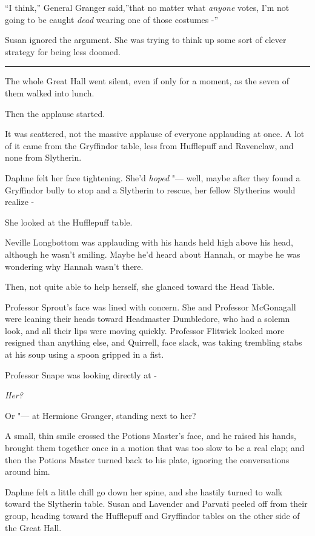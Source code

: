 ``I think,'' General Granger said,''that no matter what \emph{anyone}
votes, I'm not going to be caught \emph{dead} wearing one of those
costumes -''

Susan ignored the argument. She was trying to think up some sort of
clever strategy for being less doomed.

\begin{center}\rule{3in}{0.4pt}\end{center}

The whole Great Hall went silent, even if only for a moment, as the
seven of them walked into lunch.

Then the applause started.

It was scattered, not the massive applause of everyone applauding at
once. A lot of it came from the Gryffindor table, less from Hufflepuff
and Ravenclaw, and none from Slytherin.

Daphne felt her face tightening. She'd \emph{hoped} "--- well, maybe after
they found a Gryffindor bully to stop and a Slytherin to rescue, her
fellow Slytherins would realize -

She looked at the Hufflepuff table.

Neville Longbottom was applauding with his hands held high above his
head, although he wasn't smiling. Maybe he'd heard about Hannah, or
maybe he was wondering why Hannah wasn't there.

Then, not quite able to help herself, she glanced toward the Head Table.

Professor Sprout's face was lined with concern. She and Professor
McGonagall were leaning their heads toward Headmaster Dumbledore, who
had a solemn look, and all their lips were moving quickly. Professor
Flitwick looked more resigned than anything else, and Quirrell, face
slack, was taking trembling stabs at his soup using a spoon gripped in a
fist.

Professor Snape was looking directly at -

\emph{Her?}

Or "--- at Hermione Granger, standing next to her?

A small, thin smile crossed the Potions Master's face, and he raised his
hands, brought them together once in a motion that was too slow to be a
real clap; and then the Potions Master turned back to his plate,
ignoring the conversations around him.

Daphne felt a little chill go down her spine, and she hastily turned to
walk toward the Slytherin table. Susan and Lavender and Parvati peeled
off from their group, heading toward the Hufflepuff and Gryffindor
tables on the other side of the Great Hall.

